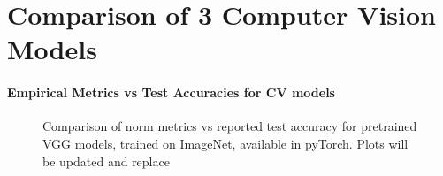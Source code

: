 \section{Comparison of 3 Computer Vision Models}
\label{sxn:cv}

\paragraph{Empirical Metrics vs Test Accuracies for CV models}

\begin{figure}[t]
    \centering
    \qquad
    \qquad
    \qquad
    \caption{Comparison of norm metrics vs reported test accuracy for pretrained VGG models, trained on ImageNet, available in pyTorch.  Plots will be updated and replace }
    

    \label{fig:vgg-metrics}
\end{figure}


